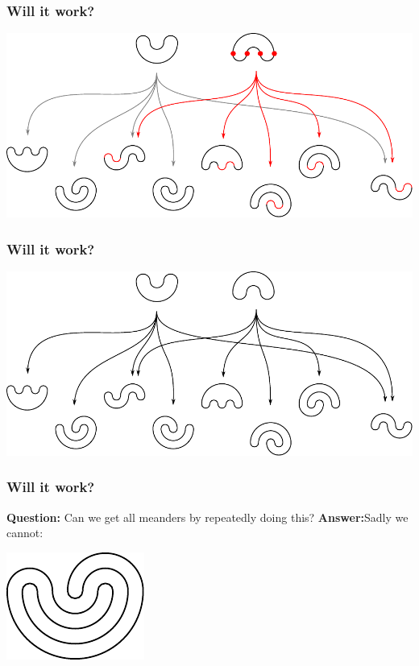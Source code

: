 \documentclass{beamer}
\begin{document}
\begin{frame}
\frametitle{Will it work?}
\begin{center}
\includegraphics[width=\textwidth]{meanders/2-into-3_3.pdf}
\end{center}
\end{frame}

\begin{frame}
\frametitle{Will it work?}
\begin{center}
\includegraphics[width=\textwidth]{meanders/2-into-3_4.pdf}
\end{center}
\end{frame}

\begin{frame}
\frametitle{Will it work?}
\textbf{Question:} Can we get all meanders by repeatedly doing this?
\pause
\textbf{Answer:}\pause Sadly we cannot:

\begin{center}
\includegraphics[width=.4\textwidth]{meanders/5-example.pdf}
\end{center}

\end{frame}
\end{document}
